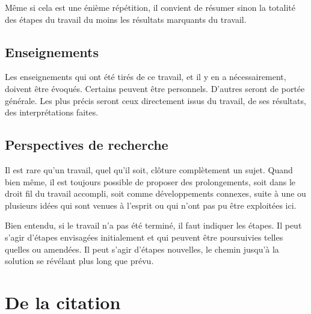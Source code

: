 \documentclass[11pt, french]{report-rd-info}
\begin{document}
Même si cela est une énième répétition, il convient de résumer sinon la totalité des étapes du travail du moins les résultats marquants du travail.

\section{Enseignements}

Les enseignements qui ont été tirés de ce travail, et il y en a nécessairement, doivent  être évoqués. Certains peuvent être personnels. D'autres seront de portée générale. Les plus précis seront ceux directement issus du travail, de ses résultats, des interprétations faites.

\section{Perspectives de recherche}

Il est rare qu'un travail, quel qu'il soit, clôture complètement un sujet. Quand bien même, il est toujours possible de proposer des prolongements, soit dans le droit fil du travail accompli, soit comme développements connexes, suite à une ou plusieurs idées qui sont venues à l'esprit ou qui n'ont pas pu être exploitées ici.

Bien entendu, si le travail n'a pas été terminé, il faut indiquer les étapes. Il peut s'agir d'étapes envisagées initialement et qui peuvent être poursuivies telles quelles ou amendées. Il peut s'agir d'étapes nouvelles, le chemin jusqu'à la solution se révélant plus long que prévu.


\nocite{*} %



\listoffigures{}

\listoftables{}

\listofalgorithms{}

\appendix

\chapter{De la citation}
\label{ann:Citations}
\end{document}
